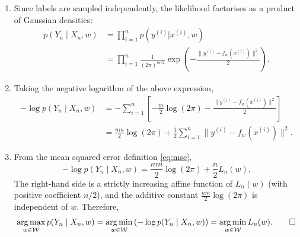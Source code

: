 \documentclass[11pt]{article}
\DeclareMathOperator*{\argmin}{arg\,min}
\DeclareMathOperator*{\argmax}{arg\,max}
\newcommand{\W}{\mathcal{W}}
\begin{document}
\begin{solution}
\begin{enumerate}
    \item
        Since labels are sampled independently, the likelihood factorises as a
        product of Gaussian densities:
        \begin{align*}
            p(Y_n \mid X_n, w)
            &= \prod_{i=1}^n p(y^{(i)} | x^{(i)}, w)
            \\
            &= \prod_{i=1}^n
                \frac{1}{(2\pi)^{m/2}}
                \exp\!\left(
                    -\frac{\|y^{(i)} - f_w(x^{(i)})\|^2}{2}
                \right).
        \end{align*}

    \item
        Taking the negative logarithm of the above expression,
        \begin{align*}
            -\log p(Y_n \mid X_n, w)
            &= -\sum_{i=1}^n \left[
                -\frac{m}{2}\log(2\pi)
                - \frac{\|y^{(i)} - f_w(x^{(i)})\|^2}{2}
            \right]
            \\
            &= \frac{nm}{2}\log(2\pi)
                + \frac{1}{2}\sum_{i=1}^n
                    \|y^{(i)} - f_w(x^{(i)})\|^2.
        \end{align*}

    \item
        From the mean squared error definition \eqref{eq:mse},
        \begin{equation*}
            -\log p(Y_n \mid X_n, w)
            = \frac{nm}{2}\log(2\pi) + \frac{n}{2} L_n(w).
        \end{equation*}
        The right-hand side is a strictly increasing affine function of
        $L_n(w)$ (with positive coefficient $n/2$), and the additive constant
        $\frac{nm}{2}\log(2\pi)$ is independent of $w$. Therefore,
        \begin{equation*}
            \argmax_{w\in\W} p(Y_n \mid X_n, w)
            = \argmin_{w\in\W} \left(-\log p(Y_n \mid X_n, w)\right)
            = \argmin_{w\in\W} L_n(w). \qedhere
        \end{equation*}
\end{enumerate}
\end{solution}
\end{document}
